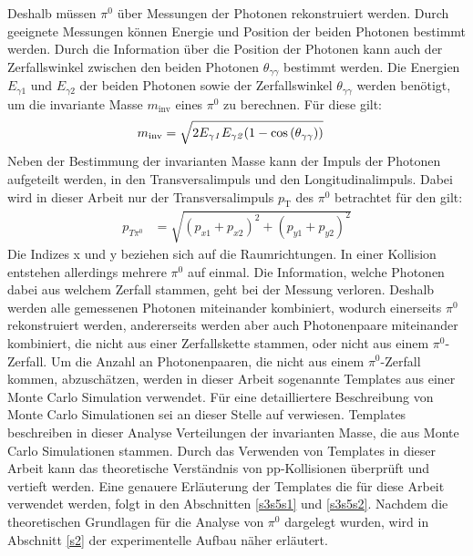 Deshalb müssen $\pi^{0}$ über Messungen der Photonen rekonstruiert werden.
Durch geeignete Messungen können Energie und Position der beiden Photonen bestimmt werden.
Durch die Information über die Position der Photonen kann auch der Zerfallswinkel zwischen den beiden Photonen $\theta_{\gamma\gamma}$ bestimmt werden.
Die Energien $E_{\gamma1}$ und $E_{\gamma2}$ der beiden Photonen sowie der Zerfallswinkel $\theta_{\gamma\gamma}$ werden benötigt, um die invariante Masse $m_{\text{inv}}$ eines $\pi^{0}$ zu berechnen.
Für diese gilt:
\begin{align}
m_{\text{inv}} &= \sqrt{2E_{\gamma\it{1}}E_{\gamma\it{2}}(1-\cos\left( \theta_{\gamma\gamma}\right) )} \label{eq_invmass}
\end{align}
\newline
Neben der Bestimmung der invarianten Masse kann der Impuls der Photonen aufgeteilt werden, in den Transversalimpuls und den Longitudinalimpuls.
Dabei wird in dieser Arbeit nur der Transversalimpuls $p_\text{T}$ des $\pi^{0}$ betrachtet für den gilt:
\begin{align}
p_{T\pi^{0}} &= \sqrt{\left(p_{x1}+p_{x2}\right)^{2} +\left(p_{y1}+p_{y2}\right)^{2}} \label{eq_pt}
\end{align}
Die Indizes x und y beziehen sich auf die Raumrichtungen.
\newline
In einer Kollision entstehen allerdings mehrere $\pi^{0}$ auf einmal.
Die Information, welche Photonen dabei aus welchem Zerfall stammen, geht bei der Messung verloren.
Deshalb werden alle gemessenen Photonen miteinander kombiniert, wodurch einerseits $\pi^{0}$ rekonstruiert werden, andererseits werden aber auch Photonenpaare miteinander kombiniert, die nicht aus einer Zerfallskette stammen, oder nicht aus einem $\pi^{0}$-Zerfall.
Um die Anzahl an Photonenpaaren, die nicht aus einem $\pi^{0}$-Zerfall kommen, abzuschätzen, werden in dieser Arbeit sogenannte Templates aus einer Monte Carlo Simulation verwendet.
Für eine detailliertere Beschreibung von Monte Carlo Simulationen sei an dieser Stelle auf \cite{thesis:Krissy} verwiesen.
Templates beschreiben in dieser Analyse Verteilungen der invarianten Masse, die aus Monte Carlo Simulationen stammen.
Durch das Verwenden von Templates in dieser Arbeit kann das theoretische Verständnis von pp-Kollisionen überprüft und vertieft werden.
Eine genauere Erläuterung der Templates die für diese Arbeit verwendet werden, folgt in den Abschnitten \ref{s3s5s1} und \ref{s3s5s2}.
\newline
Nachdem die theoretischen Grundlagen für die Analyse von $\pi^{0}$ dargelegt wurden, wird in Abschnitt \ref{s2} der experimentelle Aufbau näher erläutert.